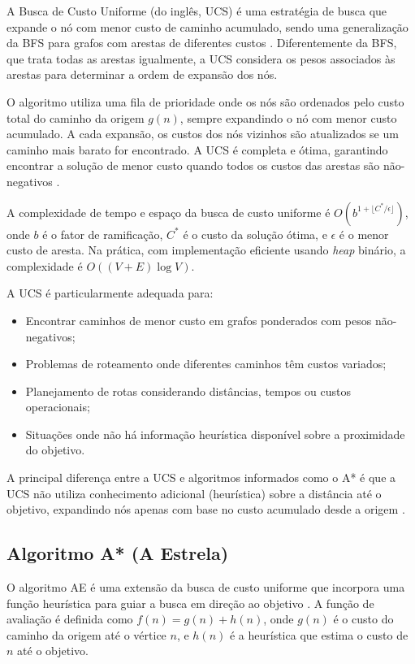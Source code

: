 A Busca de Custo Uniforme (do inglês, \gls{UCS}) é uma estratégia de busca 
que expande o nó com menor custo de caminho acumulado, sendo uma generalização da \gls{BFS} para 
grafos com arestas de diferentes custos \cite{RUSSELL2013}. Diferentemente da BFS, que trata 
todas as arestas igualmente, a UCS considera os pesos associados às arestas para determinar 
a ordem de expansão dos nós.

O algoritmo utiliza uma fila de prioridade onde os nós são ordenados pelo custo total do 
caminho da origem $g(n)$, sempre expandindo o nó com menor custo acumulado. A cada expansão, 
os custos dos nós vizinhos são atualizados se um caminho mais barato for encontrado. A UCS 
é completa e ótima, garantindo encontrar a solução de menor custo quando todos os custos das 
arestas são não-negativos \cite{RUSSELL2013}.

A complexidade de tempo e espaço da busca de custo uniforme é $O(b^{1+\lfloor C^*/\epsilon \rfloor})$, 
onde $b$ é o fator de ramificação, $C^*$ é o custo da solução ótima, e $\epsilon$ é o menor 
custo de aresta. Na prática, com implementação eficiente usando \textit{heap} binário, a complexidade 
é $O((V + E) \log V)$.

A UCS é particularmente adequada para:

\begin{itemize}
    \item Encontrar caminhos de menor custo em grafos ponderados com pesos não-negativos;
    \item Problemas de roteamento onde diferentes caminhos têm custos variados;
    \item Planejamento de rotas considerando distâncias, tempos ou custos operacionais;
    \item Situações onde não há informação heurística disponível sobre a proximidade do objetivo.
\end{itemize}

A principal diferença entre a UCS e algoritmos informados como o A* é que a UCS não utiliza 
conhecimento adicional (heurística) sobre a distância até o objetivo, expandindo nós apenas 
com base no custo acumulado desde a origem \cite{RUSSELL2013}.



\subsection{Algoritmo A* (A Estrela)}

O algoritmo \gls{AE} é uma extensão da busca de custo uniforme que incorpora uma função heurística 
para guiar a busca em direção ao objetivo \cite{RUSSELL2013}. A função de avaliação é definida 
como $f(n) = g(n) + h(n)$, onde $g(n)$ é o custo do caminho da origem até o vértice $n$, e 
$h(n)$ é a heurística que estima o custo de $n$ até o objetivo.

